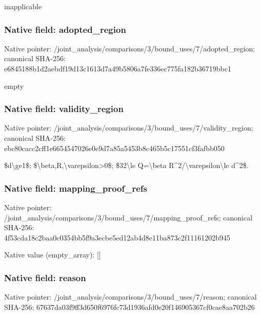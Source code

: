 \documentclass[10pt,a4paper]{article}
\begin{document}
inapplicable


\subsubsection{Native field: adopted\_region}


Native pointer: /joint\_analysis/comparis\allowbreak{}ons/3/bound\_uses/7/adopt\allowbreak{}ed\_region; canonical SHA-256: e6845188b1d2aebdf19d13c1\allowbreak{}613d7a49b5806a7fe336ec77\allowbreak{}5fa182b36719bbc1


empty


\subsubsection{Native field: validity\_region}


Native pointer: /joint\_analysis/comparis\allowbreak{}ons/3/bound\_uses/7/valid\allowbreak{}ity\_region; canonical SHA-256: ebc80cacc2cff1e665454702\allowbreak{}6e0e9d7a85a5453b8c465b5c\allowbreak{}17551cf3fafbb050


\$d\textbackslash{}ge1\$; \$\textbackslash{}beta,R,\textbackslash{}varepsilon>0\$; \$32\textbackslash{}le Q=\textbackslash{}beta R\textasciicircum{}2/\textbackslash{}varepsilon\textbackslash{}le d\textasciicircum{}2\$.


\subsubsection{Native field: mapping\_proof\_refs}


Native pointer: /joint\_analysis/comparis\allowbreak{}ons/3/bound\_uses/7/mappi\allowbreak{}ng\_proof\_refs; canonical SHA-256: 4f53cda18c2baa0c0354bb5f\allowbreak{}9a3ecbe5ed12ab4d8e11ba87\allowbreak{}3c2f11161202b945



Native value (empty\_array): []



\subsubsection{Native field: reason}


Native pointer: /joint\_analysis/comparis\allowbreak{}ons/3/bound\_uses/7/reaso\allowbreak{}n; canonical SHA-256: 67637da03f9ff3d650f6976f\allowbreak{}c73d1936afd0e20f14690536\allowbreak{}7cf0cae8aa702b26
\end{document}
